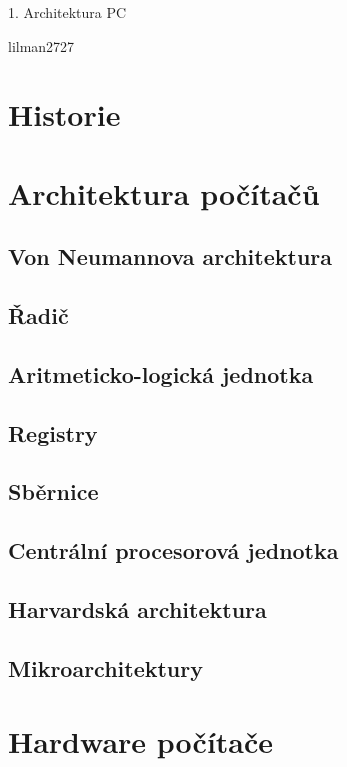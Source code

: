 \documentclass[a4paper]{article}
\begin{document}
\thispagestyle{empty}
\begin{center}
    \vspace*{5cm}
    {\huge{1. Architektura PC}} \par
    \vspace{15cm}
    {\large{lilman2727}}
\end{center}


\newpage
\thispagestyle{empty}
\tableofcontents
\newpage

\section{Historie}

\section{Architektura počítačů}
    \subsection{Von Neumannova architektura}
    \subsection{Řadič}
    \subsection{Aritmeticko-logická jednotka}
    \subsection{Registry}
    \subsection{Sběrnice}
    \subsection{Centrální procesorová jednotka}
    \subsection{Harvardská architektura}
    \subsection{Mikroarchitektury}

\section{Hardware počítače}
\end{document}
